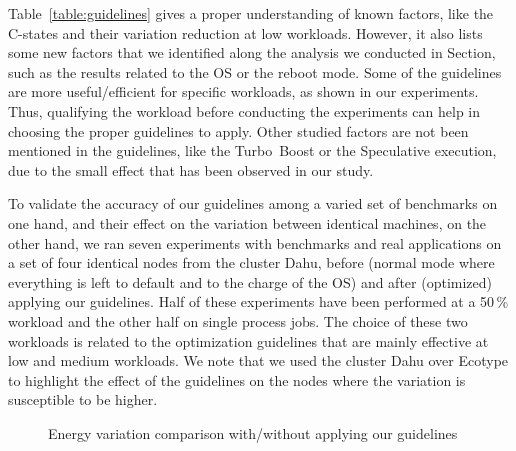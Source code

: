 Table~\ref{table:guidelines} gives a proper understanding of known factors, like the C-states and their variation reduction at low workloads.
However, it also lists some new factors that we identified along the analysis we conducted in Section, such as the results related to the OS or the reboot mode.
Some of the guidelines are more useful/efficient for specific workloads, as shown in our experiments.
Thus, qualifying the workload before conducting the experiments can help in choosing the proper guidelines to apply.
Other studied factors are not been mentioned in the guidelines, like the Turbo~Boost or the Speculative execution, due to the small effect that has been observed in our study.

To validate the accuracy of our guidelines among a varied set of benchmarks on one hand, and their effect on the variation between identical machines, on the other hand, we ran seven experiments with benchmarks and real applications on a set of four identical nodes from the cluster \textsf{Dahu}, before (\textsf{normal} mode where everything is left to default and to the charge of the OS) and after (\textsf{optimized}) applying our guidelines.
Half of these experiments have been performed at a 50\,\% workload and the other half on single process jobs.
The choice of these two workloads is related to the optimization guidelines that are mainly effective at low and medium workloads.
We note that we used the cluster \textsf{Dahu} over \textsf{Ecotype} to highlight the effect of the guidelines on the nodes where the variation is susceptible to be higher.

\begin{figure}[htb]
    \caption{Energy variation comparison with/without applying our guidelines}\label{fig:optimized}
\end{figure}

